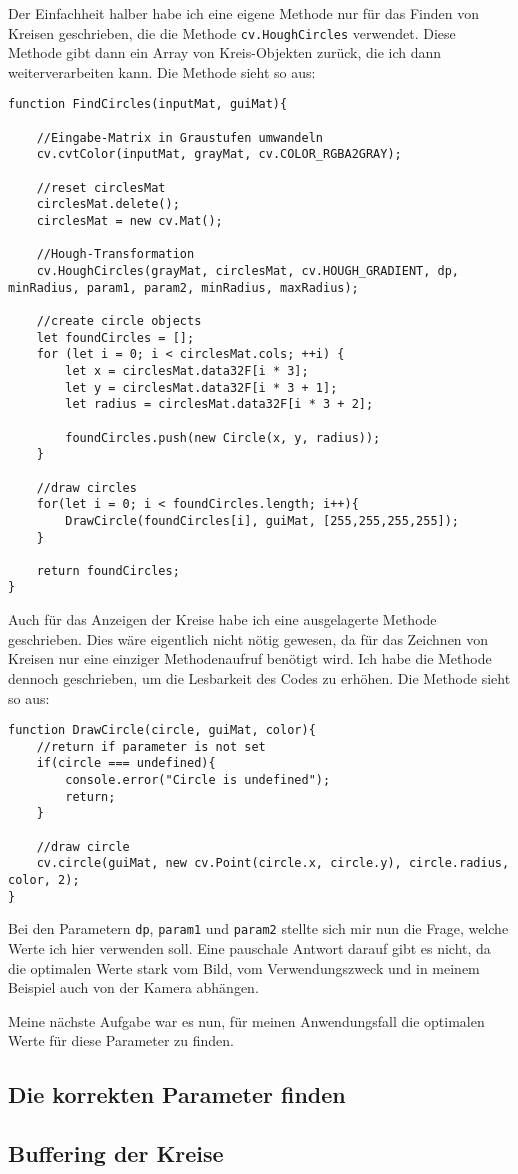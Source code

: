 Der Einfachheit halber habe ich eine eigene Methode nur für das Finden von Kreisen geschrieben, die die Methode \texttt{cv.HoughCircles} verwendet. Diese Methode gibt dann ein Array von Kreis-Objekten zurück, die ich dann weiterverarbeiten kann. Die Methode sieht so aus:

\begin{lstlisting}[style=JavaScript]
function FindCircles(inputMat, guiMat){

    //Eingabe-Matrix in Graustufen umwandeln
    cv.cvtColor(inputMat, grayMat, cv.COLOR_RGBA2GRAY);

    //reset circlesMat
    circlesMat.delete();
    circlesMat = new cv.Mat();

    //Hough-Transformation
    cv.HoughCircles(grayMat, circlesMat, cv.HOUGH_GRADIENT, dp, minRadius, param1, param2, minRadius, maxRadius);

    //create circle objects
    let foundCircles = [];
    for (let i = 0; i < circlesMat.cols; ++i) {
        let x = circlesMat.data32F[i * 3];
        let y = circlesMat.data32F[i * 3 + 1];
        let radius = circlesMat.data32F[i * 3 + 2];

        foundCircles.push(new Circle(x, y, radius));
    }

    //draw circles
    for(let i = 0; i < foundCircles.length; i++){
        DrawCircle(foundCircles[i], guiMat, [255,255,255,255]);
    }

    return foundCircles;
}
\end{lstlisting}

Auch für das Anzeigen der Kreise habe ich eine ausgelagerte Methode geschrieben. Dies wäre eigentlich nicht nötig gewesen, da für das Zeichnen von Kreisen nur eine einziger Methodenaufruf benötigt wird. Ich habe die Methode dennoch geschrieben, um die Lesbarkeit des Codes zu erhöhen. Die Methode sieht so aus:

\begin{lstlisting}[style=JavaScript]
function DrawCircle(circle, guiMat, color){
    //return if parameter is not set
    if(circle === undefined){
        console.error("Circle is undefined");
        return;
    }

    //draw circle
    cv.circle(guiMat, new cv.Point(circle.x, circle.y), circle.radius, color, 2);
}
\end{lstlisting}

Bei den Parametern \texttt{dp}, \texttt{param1} und \texttt{param2} stellte sich mir nun die Frage, welche Werte ich hier verwenden soll. Eine pauschale Antwort darauf gibt es nicht, da die optimalen Werte stark vom Bild, vom Verwendungszweck und in meinem Beispiel auch von der Kamera abhängen.

Meine nächste Aufgabe war es nun, für meinen Anwendungsfall die optimalen Werte für diese Parameter zu finden. 

\subsection{Die korrekten Parameter finden}
\subsection{Buffering der Kreise}